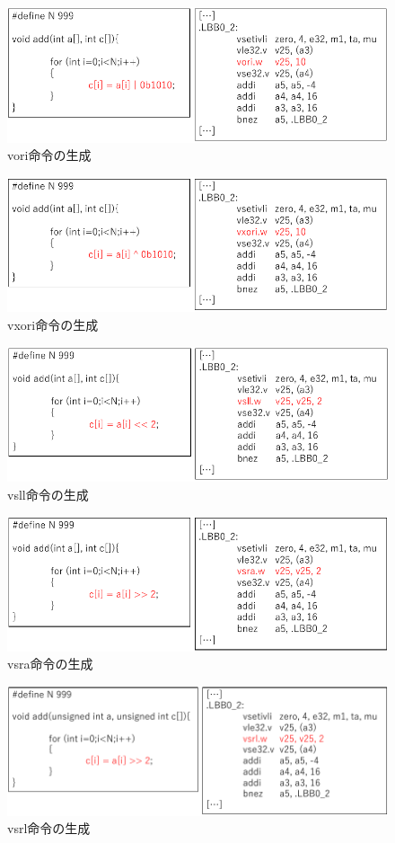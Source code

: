\begin{figure}
    \centering
    \includegraphics[scale=0.8]{image/vori.pdf}
    \caption{vori命令の生成}
    \label{fig:vori}
\end{figure}

\begin{figure}
    \centering
    \includegraphics[scale=0.8]{image/vxori.pdf}
    \caption{vxori命令の生成}
    \label{fig:vxori}
\end{figure}

\begin{figure}
    \centering
    \includegraphics[scale=0.8]{image/vsll.pdf}
    \caption{vsll命令の生成}
    \label{fig:vsll}
\end{figure}

\begin{figure}
    \centering
    \includegraphics[scale=0.8]{image/vsra.pdf}
    \caption{vsra命令の生成}
    \label{fig:vsra}
\end{figure}

\begin{figure}
    \centering
    \includegraphics[scale=0.8]{image/vsrl.pdf}
    \caption{vsrl命令の生成}
    \label{fig:vsrl}
\end{figure}